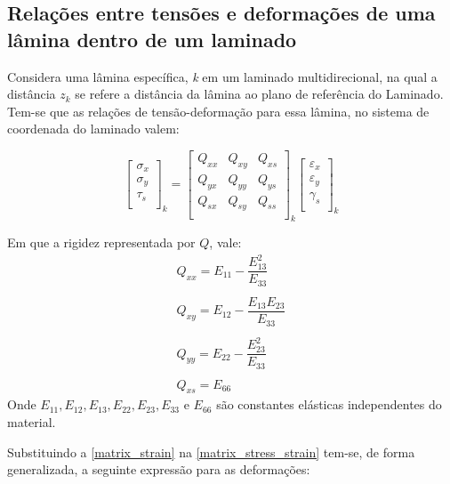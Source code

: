 \subsection{Relações entre tensões e deformações de uma lâmina dentro de um laminado}
Considera uma lâmina específica, \emph{k} em um laminado multidirecional, na qual a distância \emph{$z_k$} se refere a distância da lâmina ao plano de referência do Laminado. Tem-se que as relações de tensão-deformação para essa lâmina, no sistema de coordenada do laminado valem:

\begin{equation} \label{matrix_stress_strain}
\begin{bmatrix}
    \sigma_{x} \\
    \sigma_{y} \\
    \tau_{s} \\
\end{bmatrix}_k
=
\begin{bmatrix}
		Q_{xx} & Q_{xy} & Q_{xs} \\
		Q_{yx} & Q_{yy} & Q_{ys} \\
		Q_{sx} & Q_{sy} & Q_{ss} \\
\end{bmatrix}_k
\begin{bmatrix}
    \varepsilon_{x} \\
    \varepsilon_{y} \\
    \gamma_{s} \\
\end{bmatrix}_k
\end{equation}

Em que a rigidez representada por $Q$, vale:
\begin{equation} \label{StiffnessQ}
\begin{gathered}
Q_{xx} = E_{11} - \dfrac{E^2_{13}}{E_{33}}\\~\\
Q_{xy} = E_{12} - \dfrac{E_{13}E_{23}}{E_{33}}\\~\\
Q_{yy} = E_{22} - \dfrac{E^2_{23}}{E_{33}}\\~\\
Q_{xs} = E_{66}
\end{gathered}
\end{equation}
Onde $E_{11}, E_{12}, E_{13}, E_{22}, E_{23}, E_{33}$ e $E_{66}$ são constantes elásticas independentes do material.

Substituindo a \autoref{matrix_strain} na \autoref{matrix_stress_strain} tem-se, de forma generalizada, a seguinte expressão para as deformações:

